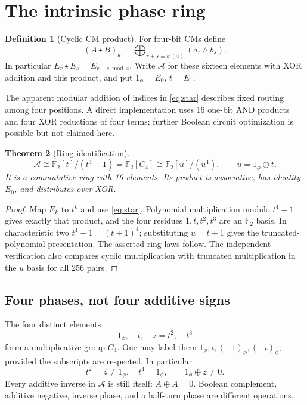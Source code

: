\documentclass[11pt,a4paper]{article}
\newtheorem{theorem}{Theorem}[section]
\theoremstyle{definition}\newtheorem{definition}[theorem]{Definition}
\theoremstyle{remark}\newtheorem{remark}[theorem]{Remark}
\newcommand{\F}{\mathbb F}
\newcommand{\alg}{\mathcal A}
\newcommand{\one}{1_{\phi}}
\numberwithin{equation}{section}
\begin{document}
\section{The intrinsic phase ring}\label{sec:ring}
\begin{definition}[Cyclic CM product]
For four-bit CMs define
\begin{equation}\label{eq:star}
 (A\star B)_k=\bigoplus_{r+s\equiv k\ (4)} (a_r\land b_s).
\end{equation}
In particular $E_r\star E_s=E_{r+s\bmod4}$. Write $\alg$ for these sixteen elements with XOR addition and this product, and put $\one=E_0$, $t=E_1$.
\end{definition}
The apparent modular addition of indices in \cref{eq:star} describes fixed routing among four positions. A direct implementation uses 16 one-bit AND products and four XOR reductions of four terms; further Boolean circuit optimization is possible but not claimed here.

\begin{theorem}[Ring identification]\label{thm:ring}
\begin{equation}
 \alg\cong\F_2[t]/(t^4-1)=\F_2[C_4]\cong\F_2[u]/(u^4),\qquad u=\one\oplus t.
\end{equation}
It is a commutative ring with 16 elements. Its product is associative, has identity $E_0$, and distributes over XOR.
\end{theorem}
\begin{proof}
Map $E_k$ to $t^k$ and use \cref{eq:star}. Polynomial multiplication modulo $t^4-1$ gives exactly that product, and the four residues $1,t,t^2,t^3$ are an $\F_2$ basis. In characteristic two $t^4-1=(t+1)^4$; substituting $u=t+1$ gives the truncated-polynomial presentation. The asserted ring laws follow. The independent verification also compares cyclic multiplication with truncated multiplication in the $u$ basis for all 256 pairs.
\end{proof}

\subsection{Four phases, not four additive signs}
The four distinct elements
\begin{equation}\label{eq:phasefour}
 \one,\quad t,\quad z=t^2,\quad t^3
\end{equation}
form a multiplicative group $C_4$. One may label them $1_\phi,\iota,(-1)_\phi,(-\iota)_\phi$, provided the subscripts are respected. In particular
\begin{equation}
 t^2=z\ne\one,\quad t^4=\one,\qquad \one\oplus z\ne0.
\end{equation}
Every additive inverse in $\alg$ is still itself: $A\oplus A=0$. Boolean complement, additive negative, inverse phase, and a half-turn phase are different operations.
\end{document}
